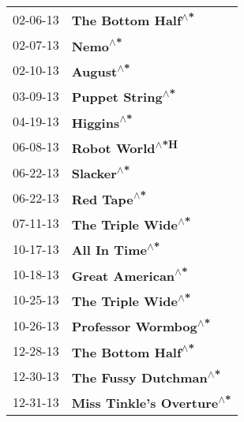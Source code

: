\begin{supertabular}{p{0.25\columnwidth}p{0.75\columnwidth}}
 02-06-13 &         \textbf{The Bottom Half\textsuperscript{$\wedge$*}} \\
 02-07-13 &                    \textbf{Nemo\textsuperscript{$\wedge$*}} \\
 02-10-13 &                  \textbf{August\textsuperscript{$\wedge$*}} \\
 03-09-13 &           \textbf{Puppet String\textsuperscript{$\wedge$*}} \\
 04-19-13 &                 \textbf{Higgins\textsuperscript{$\wedge$*}} \\
 06-08-13 &            \textbf{Robot World\textsuperscript{$\wedge$*H}} \\
 06-22-13 &                 \textbf{Slacker\textsuperscript{$\wedge$*}} \\
 06-22-13 &                \textbf{Red Tape\textsuperscript{$\wedge$*}} \\
 07-11-13 &         \textbf{The Triple Wide\textsuperscript{$\wedge$*}} \\
 10-17-13 &             \textbf{All In Time\textsuperscript{$\wedge$*}} \\
 10-18-13 &          \textbf{Great American\textsuperscript{$\wedge$*}} \\
 10-25-13 &         \textbf{The Triple Wide\textsuperscript{$\wedge$*}} \\
 10-26-13 &       \textbf{Professor Wormbog\textsuperscript{$\wedge$*}} \\
 12-28-13 &         \textbf{The Bottom Half\textsuperscript{$\wedge$*}} \\
 12-30-13 &      \textbf{The Fussy Dutchman\textsuperscript{$\wedge$*}} \\
 12-31-13 &  \textbf{Miss Tinkle's Overture\textsuperscript{$\wedge$*}} \\
\end{supertabular}

